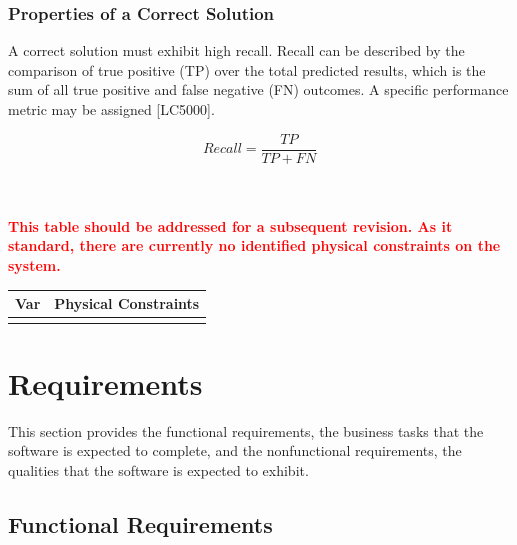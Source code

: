 \documentclass[12pt]{article}
\begin{document}
\subsubsection{Properties of a Correct Solution} \label{sec_CorrectSolution}

\noindent
A correct solution must exhibit high recall. Recall can be described by the comparison of true positive (TP) over the 
total predicted results, which is the sum of all true positive and false negative (FN) outcomes. A specific performance metric 
may be assigned [LC5000].

$$Recall = \frac{TP}{TP + FN}$$



\noindent
\\
\\
\textcolor{red}{\textbf{This table should be addressed for a subsequent revision. As it standard, there are currently no 
identified physical constraints on the system.}}
\begin{table}[!h]
\caption{Output Variables} \label{TblOutputVar}
\renewcommand{\arraystretch}{1.2}
\noindent \begin{longtable*}{l l} 
  \toprule
  \textbf{Var} & \textbf{Physical Constraints} \\
  \midrule 

  \\
  \bottomrule
\end{longtable*}
\end{table}

\section{Requirements}


This section provides the functional requirements, the business tasks that the
software is expected to complete, and the nonfunctional requirements, the
qualities that the software is expected to exhibit.

\newpage
\subsection{Functional Requirements}
\end{document}
